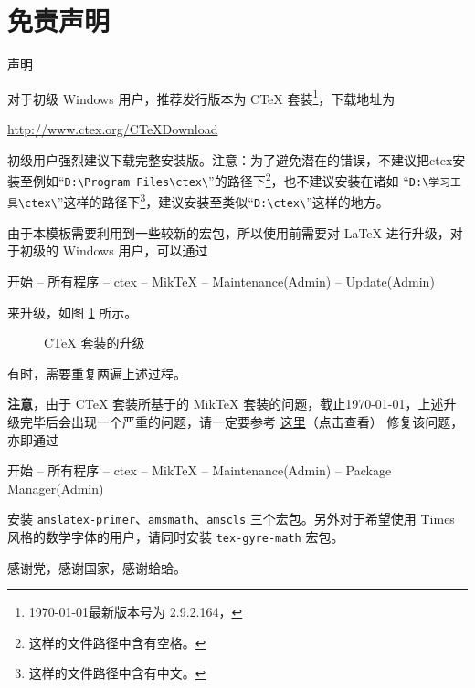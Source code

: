 \documentclass[%
               amsthm,
              ]{xjtubsc}
\begin{document}
\section{免责声明}
声明

\backmatter

\nocite{*}



\label{append:install}

对于初级 Windows 用户，推荐发行版本为 C\TeX{} 套装\footnote{\today 最新版本号为 2.9.2.164，}，下载地址为
\begin{center}
\url{http://www.ctex.org/CTeXDownload}
\end{center}
初级用户强烈建议下载完整安装版。注意：为了避免潜在的错误，不建议把ctex安装至例如“\verb|D:\Program Files\ctex\|”的路径下\footnote{这样的文件路径中含有空格。}，也不建议安装在诸如 “\verb|D:\学习工具\ctex\|”这样的路径下\footnote{这样的文件路径中含有中文。}，建议安装至类似“\verb|D:\ctex\|”这样的地方。

由于本模板需要利用到一些较新的宏包，所以使用前需要对 LaTeX 进行升级，对于初级的 Windows 用户，可以通过
\begin{center}
开始 -- 所有程序 -- ctex -- MikTeX -- Maintenance(Admin) -- Update(Admin)
\end{center}
来升级，如图 \ref{fig:update} 所示。
\begin{figure}[h]
\centering
{}\quad
{}
\caption{C\TeX{} 套装的升级}\label{fig:update}
\end{figure}
有时，需要重复两遍上述过程。

{\color{red}\textbf{注意}}，由于 C\TeX{} 套装所基于的 MikTeX 套装的问题，截止\today，上述升级完毕后会出现一个严重的问题，请一定要参考 \href{http://tex.stackexchange.com/questions/96778/a-miktex-update-removed-amsmath-as-obsolete-can-i-use-another-package-or-get-i/96795#96795}{这里}（点击查看）
修复该问题，亦即通过
\begin{center}
开始 -- 所有程序 -- ctex -- MikTeX -- Maintenance(Admin) -- Package Manager(Admin)
\end{center}
安装 \verb|amslatex-primer|、\verb|amsmath|、\verb|amscls| 三个宏包。另外对于希望使用 Times 风格的数学字体的用户，请同时安装 \verb|tex-gyre-math| 宏包。




\begin{acknowledgment}
感谢党，感谢国家，感谢蛤蛤。
\end{acknowledgment}
\end{document}
